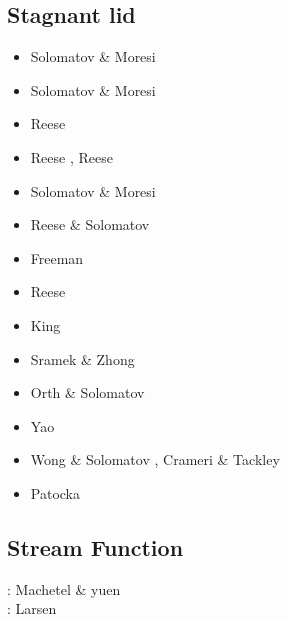 \subsection{Stagnant lid} 

\begin{scriptsize}
\begin{itemize}
\item[\nineteenninetysix] Solomatov \& Moresi \cite{somo96}
\item[\nineteenninetyseven] Solomatov \& Moresi \cite{somo97}
\item[\nineteenninetyeight] Reese \etal \cite{resm98}
\item[\nineteenninetynine] Reese \etal \cite{resm99}, Reese \etal \cite{resb99}
\item[\twothousand] Solomatov \& Moresi \cite{somo00}
\item[\twothousandtwo] Reese \& Solomatov \cite{reso02}
\item[\twothousandfour] Freeman \etal \cite{frmm04}
\item[\twothousandfive] Reese \etal \cite{resb05}
\item[\twothousandnine] King \cite{king09}
\item[\twothousandten] Sramek \& Zhong \cite{srzh10}
\item[\twothousandeleven] Orth \& Solomatov \cite{orso11}
\item[\twothousandfourteen] Yao \etal \cite{yadl14}
\item[\twothousandsixteen] Wong \& Solomatov \cite{woso16b}, Crameri \& Tackley \cite{crta16}
\item[\twothousandseventeen] Patocka \etal \cite{pact17}
\end{itemize}
\end{scriptsize}

\subsection{Stream Function} 

\begin{scriptsize}
\noindent
\nineteeneightynine: Machetel \& yuen \cite{mayu89} \\
\nineteenninetysix: Larsen \etal \cite{laym96} \\
\end{scriptsize}

